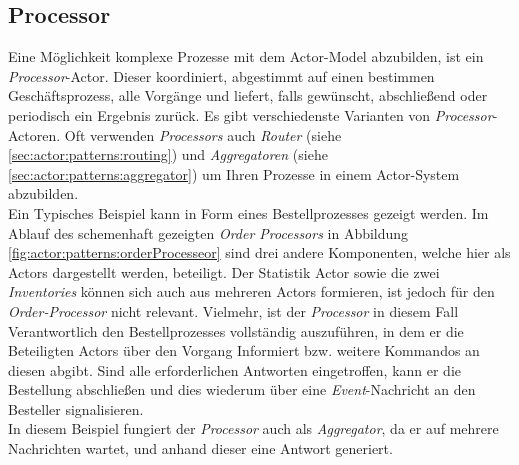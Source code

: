 \subsection{Processor}\label{sub:actor:patterns:processor}
Eine Möglichkeit komplexe Prozesse mit dem Actor-Model abzubilden, ist ein \textit{Processor}-Actor. Dieser koordiniert, abgestimmt auf einen bestimmen Geschäftsprozess, alle Vorgänge und liefert, falls gewünscht, abschließend oder periodisch ein Ergebnis zurück. Es gibt verschiedenste Varianten von \textit{Processor}-Actoren. \citep{Vernon2015ReactiveAkka}
Oft verwenden \textit{Processors} auch \textit{Router} (siehe \ref{sec:actor:patterns:routing}) und \textit{Aggregatoren} (siehe \ref{sec:actor:patterns:aggregator}) um Ihren Prozesse in einem Actor-System abzubilden. \\
Ein Typisches Beispiel kann in Form eines Bestellprozesses gezeigt werden. Im Ablauf des schemenhaft gezeigten \textit{Order Processors} in Abbildung \ref{fig:actor:patterns:orderProcesseor} sind drei andere Komponenten, welche hier als Actors dargestellt werden, beteiligt. Der Statistik Actor sowie die zwei \textit{Inventories} können sich auch aus mehreren Actors formieren, ist jedoch für den \textit{Order-Processor} nicht relevant. Vielmehr, ist der \textit{Processor} in diesem Fall Verantwortlich den Bestellprozesses vollständig auszuführen, in dem er die Beteiligten Actors über den Vorgang Informiert bzw. weitere Kommandos an diesen abgibt. Sind alle erforderlichen Antworten eingetroffen, kann er die Bestellung abschließen und dies wiederum über eine \textit{Event}-Nachricht an den Besteller signalisieren. \\
In diesem Beispiel fungiert der \textit{Processor} auch als \textit{Aggregator}, da er auf mehrere Nachrichten wartet, und anhand dieser eine Antwort generiert. 

